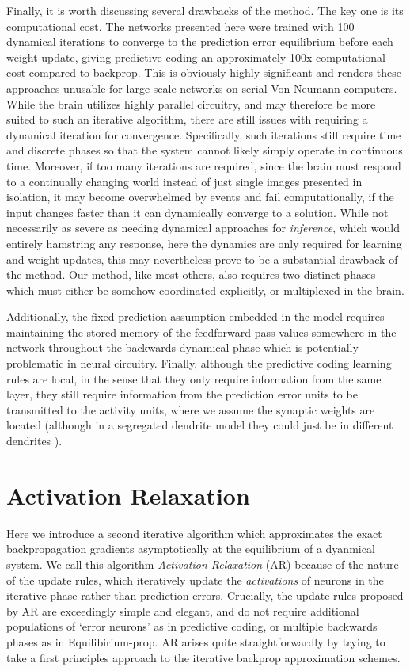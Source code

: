Finally, it is worth discussing several drawbacks of the method. The key one is its computational cost. The networks presented here were trained with 100 dynamical iterations to converge to the prediction error equilibrium before each weight update, giving predictive coding an approximately 100x computational cost compared to backprop. This is obviously highly significant and renders these approaches unusable for large scale networks on serial Von-Neumann computers. While the brain utilizes highly parallel circuitry, and may therefore be more suited to such an iterative algorithm, there are still issues with requiring a dynamical iteration for convergence. Specifically, such iterations still require time and discrete phases so that the system cannot likely simply operate in continuous time. Moreover, if too many iterations are required, since the brain must respond to a continually changing world instead of just single images presented in isolation, it may become overwhelmed by events and fail computationally, if the input changes faster than it can dynamically converge to a solution. While not necessarily as severe as needing dynamical approaches for \emph{inference}, which would entirely hamstring any response, here the dynamics are only required for learning and weight updates, this may nevertheless prove to be a substantial drawback of the method. Our method, like most others, also requires two distinct phases which must either be somehow coordinated explicitly, or multiplexed in the brain.

Additionally, the fixed-prediction assumption embedded in the model requires maintaining the stored memory of the feedforward pass values somewhere in the network throughout the backwards dynamical phase which is potentially problematic in neural circuitry. Finally, although the predictive coding learning rules are local, in the sense that they only require information from the same layer, they still require information from the prediction error units to be transmitted to the activity units, where we assume the synaptic weights are located (although in a segregated dendrite model they could just be in different dendrites \citep{sacramento2018dendritic}).

\section{Activation Relaxation}
Here we introduce a second iterative algorithm which approximates the exact backpropagation gradients asymptotically at the equilibrium of a dyanmical system. We call this algorithm \emph{Activation Relaxation} (AR) because of the nature of the update rules, which iteratively update the \emph{activations} of neurons in the iterative phase rather than prediction errors. Crucially, the update rules proposed by AR are exceedingly simple and elegant, and do not require additional populations of `error neurons' as in predictive coding, or multiple backwards phases as in Equilibirium-prop. AR arises quite straightforwardly by trying to take a first principles approach to the iterative backprop approximation schemes.

